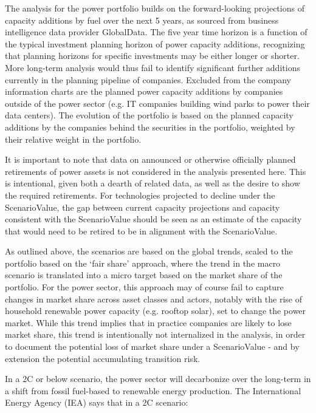 \documentclass[10pt,table,a4]{article}\usepackage[]{graphicx}\usepackage[]{color}
\begin{document}
	
	\begin{multicols}{2}
		
		The analysis for the power portfolio builds on the forward-looking projections of capacity additions by fuel over the next 5 years, as sourced from business intelligence data provider GlobalData. The five year time horizon is a function of the typical investment planning horizon of power capacity additions, recognizing that planning horizons for specific investments may be either longer or shorter. More long-term analysis would thus fail to identify significant further additions currently in the planning pipeline of companies. Excluded from the company information charts are the planned power capacity additions by companies outside of the power sector (e.g. IT companies building wind parks to power their data centers). The evolution of the portfolio is based on the planned capacity additions by the companies behind the securities in the portfolio, weighted by their relative weight in the portfolio. 
		
		It is important to note that data on announced or otherwise officially planned retirements of power assets is not considered in the analysis presented here. This is intentional, given both a dearth of related data, as well as the desire to show the required retirements. For technologies projected to decline under the ScenarioValue, the gap between current capacity projections and capacity consistent with the ScenarioValue should be seen as an estimate of the capacity that would need to be retired to be in alignment with the ScenarioValue. 
		
		As outlined above, the scenarios are based on the global trends, scaled to the portfolio based on the `fair share' approach, where the trend in the macro scenario is translated into a micro target based on the market share of the portfolio. For the power sector, this approach may of course fail to capture changes in market share across asset classes and actors, notably with the rise of household renewable power capacity (e.g. rooftop solar), set to change the power market. While this trend implies that in practice companies are likely to lose market share, this trend is intentionally not internalized in the analysis, in order to document the potential loss of market share under a ScenarioValue - and by extension the potential accumulating transition risk.
		
		In a 2\degree C or below scenario, the power sector will decarbonize over the long-term in a shift from fossil fuel-based to renewable energy production. The International Energy Agency (IEA) says that in a 2\degree C scenario:
		

\end{multicols}
\end{document}

